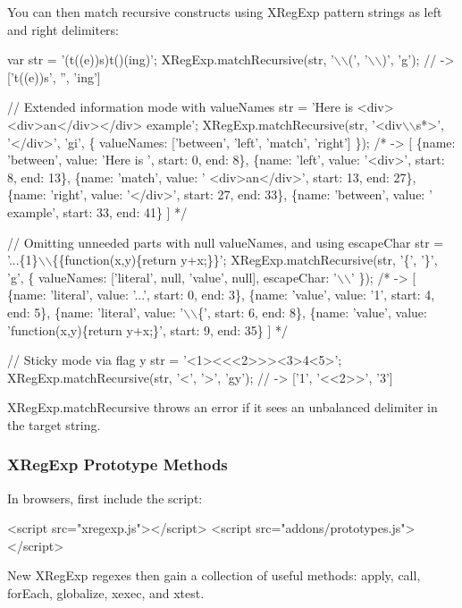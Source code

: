 You can then match recursive constructs using X\+Reg\+Exp pattern strings as left and right delimiters\+:


\begin{DoxyCode}
var str = '(t((e))s)t()(ing)';
XRegExp.matchRecursive(str, '\(\backslash\)\(\backslash\)(', '\(\backslash\)\(\backslash\))', 'g');
// -> ['t((e))s', '', 'ing']

// Extended information mode with valueNames
str = 'Here is <div> <div>an</div></div> example';
XRegExp.matchRecursive(str, '<div\(\backslash\)\(\backslash\)s*>', '</div>', 'gi', \{
    valueNames: ['between', 'left', 'match', 'right']
\});
/* -> [
\{name: 'between', value: 'Here is ',       start: 0,  end: 8\},
\{name: 'left',    value: '<div>',          start: 8,  end: 13\},
\{name: 'match',   value: ' <div>an</div>', start: 13, end: 27\},
\{name: 'right',   value: '</div>',         start: 27, end: 33\},
\{name: 'between', value: ' example',       start: 33, end: 41\}
] */

// Omitting unneeded parts with null valueNames, and using escapeChar
str = '...\{1\}\(\backslash\)\(\backslash\)\{\{function(x,y)\{return y+x;\}\}';
XRegExp.matchRecursive(str, '\{', '\}', 'g', \{
    valueNames: ['literal', null, 'value', null],
    escapeChar: '\(\backslash\)\(\backslash\)'
\});
/* -> [
\{name: 'literal', value: '...', start: 0, end: 3\},
\{name: 'value',   value: '1',   start: 4, end: 5\},
\{name: 'literal', value: '\(\backslash\)\(\backslash\)\{', start: 6, end: 8\},
\{name: 'value',   value: 'function(x,y)\{return y+x;\}', start: 9, end: 35\}
] */

// Sticky mode via flag y
str = '<1><<<2>>><3>4<5>';
XRegExp.matchRecursive(str, '<', '>', 'gy');
// -> ['1', '<<2>>', '3']
\end{DoxyCode}


{\ttfamily X\+Reg\+Exp.\+match\+Recursive} throws an error if it sees an unbalanced delimiter in the target string.

\subsubsection*{X\+Reg\+Exp Prototype Methods}

In browsers, first include the script\+:


\begin{DoxyCode}
<script src="xregexp.js"></script>
<script src="addons/prototypes.js"></script>
\end{DoxyCode}


New X\+Reg\+Exp regexes then gain a collection of useful methods\+: {\ttfamily apply}, {\ttfamily call}, {\ttfamily for\+Each}, {\ttfamily globalize}, {\ttfamily xexec}, and {\ttfamily xtest}.


